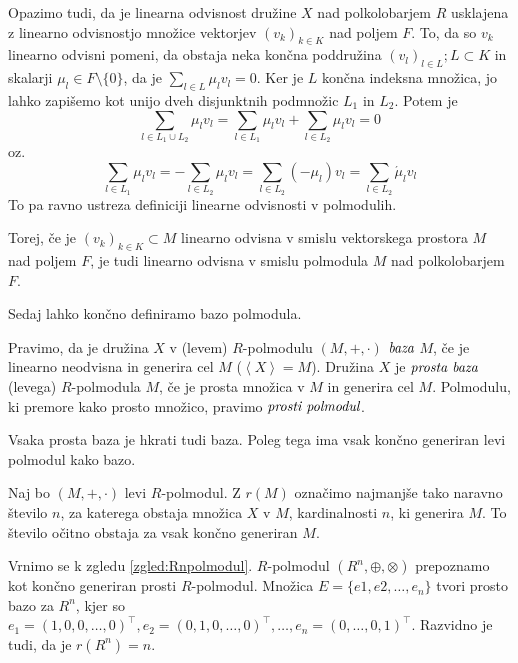 \documentclass[mat1]{fmfdelo}
\newcommand{\pojem}[1]{\ensuremath{\emph{#1}}}
\newcommand{\Gen}[1]{\ensuremath{\left<{#1}\right>}}
\begin{document}
Opazimo tudi, da je linearna odvisnost družine $X$ nad polkolobarjem $R$ usklajena z linearno odvisnostjo množice vektorjev $(v_k)_{k\in K}$ nad poljem $F$.
To, da so $v_k$ linearno odvisni pomeni, da obstaja neka končna poddružina $(v_l)_{l\in L}; L\subset K$ in skalarji $\mu_l\in F\setminus\{0\}$, da je $\sum_{l\in L}\mu_lv_l = 0$. Ker je $L$ končna indeksna množica, jo lahko zapišemo kot unijo dveh disjunktnih podmnožic $L_1$ in $L_2$. Potem je $$ \sum_{l\in L_1\cup L_2} \mu_lv_l = \sum_{l\in L_1}\mu_lv_l + \sum_{l\in L_2}\mu_lv_l = 0$$ oz. $$\sum_{l\in L_1}\mu_lv_l = - \sum_{l\in L_2}\mu_lv_l = \sum_{l\in L_2} (-\mu_l)v_l = \sum_{l\in L_2}\acute{\mu}_lv_l $$
To pa ravno ustreza definiciji linearne odvisnosti v polmodulih. 

Torej, če je $(v_k)_{k\in K} \subset M$ linearno odvisna v smislu vektorskega prostora $M$ nad poljem $F$, je tudi linearno odvisna v smislu polmodula $M$ nad polkolobarjem $F$.

Sedaj lahko končno definiramo bazo polmodula.

\begin{definicija}\label{def:polmodbaza}
	Pravimo, da je družina $X$ v (levem) $R$-polmodulu $(M, +, \cdot)$ \pojem{baza} $M$, če je linearno neodvisna in generira cel $M$ ($\Gen{X} = M$). Družina $X$ je \pojem{prosta baza} (levega) $R$-polmodula $M$, če je prosta množica v $M$ in generira cel $M$. Polmodulu, ki premore kako prosto množico, pravimo \pojem{prosti polmodul}.
\end{definicija}

\begin{opomba}
	Vsaka prosta baza je hkrati tudi baza. Poleg tega ima vsak končno generiran levi polmodul kako bazo.
\end{opomba}

\begin{definicija}
	Naj bo $(M, +, \cdot)$ levi $R$-polmodul. Z $r(M)$ označimo najmanjše tako naravno število $n$, za katerega obstaja množica $X$ v $M$, kardinalnosti $n$, ki generira $M$. To število očitno obstaja za vsak končno generiran $M$.
\end{definicija}

\begin{zgled}
	Vrnimo se k zgledu \ref{zgled:Rnpolmodul}. $R$-polmodul $(R^n, \oplus, \otimes)$ prepoznamo kot končno generiran prosti $R$-polmodul. Množica $E = \{e1, e2, \ldots, e_n\}$ tvori prosto bazo za $R^n$, kjer so $e_1 = (1, 0, 0, \ldots, 0)^\top, e_2 = (0, 1, 0, \ldots, 0)^\top, \ldots, e_n = (0, \ldots, 0, 1)^\top$. Razvidno je tudi, da je $r(R^n) = n$.
\end{zgled}
\end{document}
